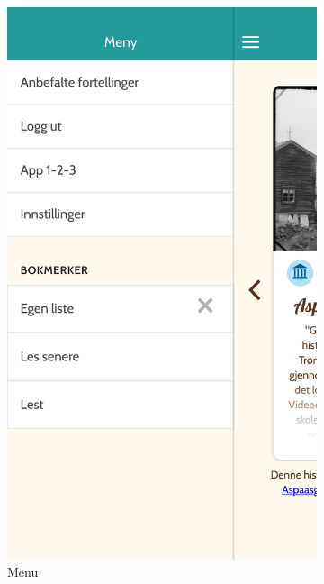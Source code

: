 \begin{appendices}
\begin{figure}[h]
	\end{figure}
	\begin{figure}[h]
		\ContinuedFloat
		\centering
		\begin{subfigure}[h]{0.3\textwidth}
			\includegraphics[width=\textwidth]{fig/screenshot_menu}
			\caption{Menu}
		\end{subfigure}
		\begin{subfigure}[h]{0.3\textwidth}

\end{subfigure}
\end{figure}
\end{appendices}
